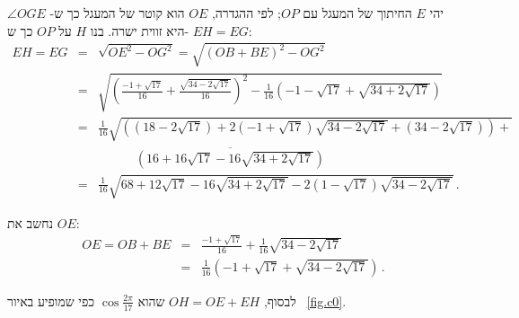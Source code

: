 \documentclass[11pt,a4paper]{article}
\newenvironment{form}[1]{%
\begin{displaymath}%
\renewcommand{\arraystretch}{#1}%
\begin{array}{lcl}}%
{\end{array}%
\end{displaymath}%
}
\newcommand*{\disfrac}[2]{\displaystyle\frac{#1}{#2}}
\begin{document}
יהי
$E$
החיתוך של המעגל עם
$OP$;
לפי ההגדרה,
$OE$
הוא קוטר של המעגל כך ש-%
$\angle OGE$
היא זווית ישרה.
בנו
$H$
על
$OP$
כך ש-%
$EH=EG$:
\begin{form}{2}
EH=EG&=&\sqrt{OE^2-OG^2}=\sqrt{(OB+BE)^2-OG^2}\\
&=&\sqrt{\left(\disfrac{-1+\sqrt{17}}{16}+\disfrac{\sqrt{34-2\sqrt{17}}}{16}\right)^2-
\disfrac{1}{16}\left(-1-\sqrt{17}+\sqrt{34+2\sqrt{17}}\right)}
\\
&=&\disfrac{1}{16}\sqrt{\left(
(18-2\sqrt{17})+ 2(-1+\sqrt{17})\sqrt{34-2\sqrt{17}}+
(34-2\sqrt{17})\right)+}\\
&&\quad\quad\quad\overline{
\left(16+16\sqrt{17}-16\sqrt{34+2\sqrt{17}}\right)}\\
&=&\disfrac{1}{16}\sqrt{
68+12\sqrt{17}-16\sqrt{34+2\sqrt{17}}-2(1-\sqrt{17})\sqrt{34-2\sqrt{17}}
}\,.
\end{form}

נחשב את
$OE$:
\begin{form}{2}
OE=OB+BE&=&\disfrac{-1+\sqrt{17}}{16}+\disfrac{1}{16}\sqrt{34-2\sqrt{17}}\\
&=&\disfrac{1}{16}\left(-1+\sqrt{17}+\sqrt{34-2\sqrt{17}}\right)\,.
\end{form}

לבסוף,
$OH=OE+EH$
שהוא
$\cos \disfrac{2\pi}{17}$
כפי שמופיע באיור%
~\ref{fig.c0}.




\end{document}

